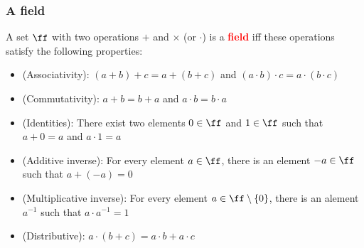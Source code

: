 \begin{frame}
  \frametitle{A field}

  A set $\ff$ with two operations $+$ and $\times$ (or $\cdot$) is a
  \textcolor{red}{\bf field} iff these operations satisfy the
  following properties:
  \begin{itemize}
    \pause
  \item (Associativity): $(a+b)+c = a+(b+c)$ and $(a\cdot b)\cdot c = a\cdot(b\cdot c)$
    \pause
  \item (Commutativity): $a+b=b+a$ and $a\cdot b=b\cdot a$
    \pause
  \item (Identities): There exist two elements $0\in\ff$ and $1\in\ff$ such that $a+0 = a$ and $a\cdot 1 = a$
    \pause
  \item (Additive inverse): For every element $a\in \ff$, there is an element $-a\in \ff$ such that $a+(-a) = 0$
    \pause
  \item (Multiplicative inverse): For every element $a\in \ff\setminus\{0\}$, there is an alement $a^{-1}$ such that $a\cdot a^{-1}=1$
    \pause
  \item (Distributive): $a\cdot(b+c)=a\cdot b + a\cdot c$
  \end{itemize}
\end{frame}

